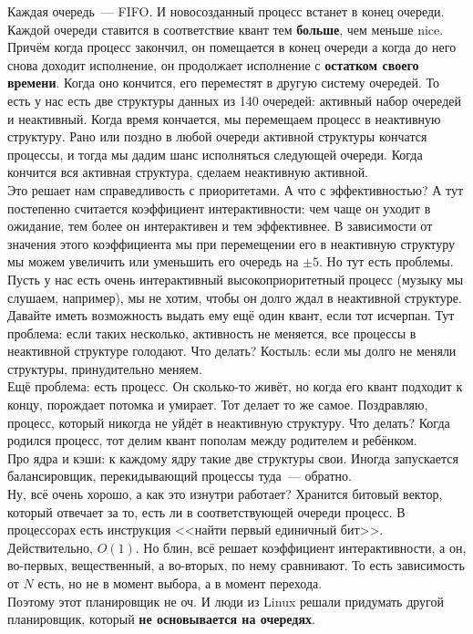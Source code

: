 \documentclass{article}
\begin{document}
    Каждая очередь~--- FIFO. И новосозданный процесс встанет в конец очереди. Каждой очереди ставится в соответствие квант тем \textbf{больше}, чем меньше nice. Причём когда процесс закончил, он помещается в конец очереди а когда до него снова доходит исполнение, он продолжает исполнение с \textbf{остатком своего времени}. Когда оно кончится, его переместят в другую систему очередей. То есть у нас есть две структуры данных из 140 очередей: активный набор очередей и неактивный. Когда время кончается, мы перемещаем процесс в неактивную структуру. Рано или поздно в любой очереди активной структуры кончатся процессы, и тогда мы дадим шанс исполняться следующей очереди. Когда кончится вся активная структура, сделаем неактивную активной.\\
    Это решает нам справедливость с приоритетами. А что с эффективностью? А тут постепенно считается коэффициент интерактивности: чем чаще он уходит в ожидание, тем более он интерактивен и тем эффективнее. В зависимости от значения этого коэффициента мы при перемещении его в неактивную структуру мы можем увеличить или уменьшить его очередь на $\pm5$. Но тут есть проблемы. Пусть у нас есть очень интерактивный высокоприоритетный процесс (музыку мы слушаем, например), мы не хотим, чтобы он долго ждал в неактивной структуре. Давайте иметь возможность выдать ему ещё один квант, если тот исчерпан. Тут проблема: если таких несколько, активность не меняется, все процессы в неактивной структуре голодают. Что делать? Костыль: если мы долго не меняли структуры, принудительно меняем.\\
    Ещё проблема: есть процесс. Он сколько-то живёт, но когда его квант подходит к концу, порождает потомка и умирает. Тот делает то же самое. Поздравляю, процесс, который никогда не уйдёт в неактивную структуру. Что делать? Когда родился процесс, тот делим квант пополам между родителем и ребёнком.\\
    Про ядра и кэши: к каждому ядру такие две структуры свои. Иногда запускается балансировщик, перекидывающий процессы туда~--- обратно.\\
    Ну, всё очень хорошо, а как это изнутри работает? Хранится битовый вектор, который отвечает за то, есть ли в соответствующей очереди процесс. В процессорах есть инструкция <<найти первый единичный бит>>. Действительно, $O(1)$. Но блин, всё решает коэффициент интерактивности, а он, во-первых, вещественный, а во-вторых, по нему сравнивают. То есть зависимость от $N$ есть, но не в момент выбора, а в момент перехода.\\
    Поэтому этот планировщик не оч. И люди из Linux решали придумать другой планировщик, который \textbf{не основывается на очередях}.
\end{document}
